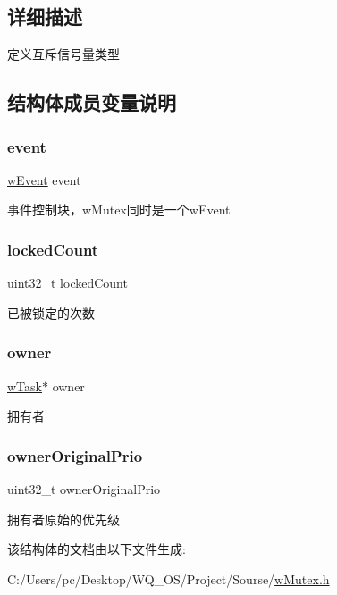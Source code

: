 \subsection{详细描述}
定义互斥信号量类型 

\subsection{结构体成员变量说明}
\mbox{\label{struct__w_mutex_ad737d3f95a5cf9ee457f37f1cedfa44a}} 
\subsubsection{\texorpdfstring{event}{event}}
{\footnotesize\ttfamily \mbox{\hyperlink{w_event_8h_af8b15988a26e1ac0d63eaf3fc5afe9d3}{w\+Event}} event}

事件控制块，w\+Mutex同时是一个w\+Event \mbox{\label{struct__w_mutex_a16598f387191bb413e5c802b23e501ef}} 
\subsubsection{\texorpdfstring{locked\+Count}{lockedCount}}
{\footnotesize\ttfamily uint32\+\_\+t locked\+Count}

已被锁定的次数 \mbox{\label{struct__w_mutex_a1ed47712ef6760f64988107466c22321}} 
\subsubsection{\texorpdfstring{owner}{owner}}
{\footnotesize\ttfamily \mbox{\hyperlink{w_task_8h_acd0e6238476f631a6ac4588629bac372}{w\+Task}}$\ast$ owner}

拥有者 \mbox{\label{struct__w_mutex_aa1d8803bb70576a417cba7092640ebd3}} 
\subsubsection{\texorpdfstring{owner\+Original\+Prio}{ownerOriginalPrio}}
{\footnotesize\ttfamily uint32\+\_\+t owner\+Original\+Prio}

拥有者原始的优先级 

该结构体的文档由以下文件生成\+:\begin{DoxyCompactItemize}
\item 
C\+:/\+Users/pc/\+Desktop/\+W\+Q\+\_\+\+O\+S/\+Project/\+Sourse/\mbox{\hyperlink{w_mutex_8h}{w\+Mutex.\+h}}\end{DoxyCompactItemize}
